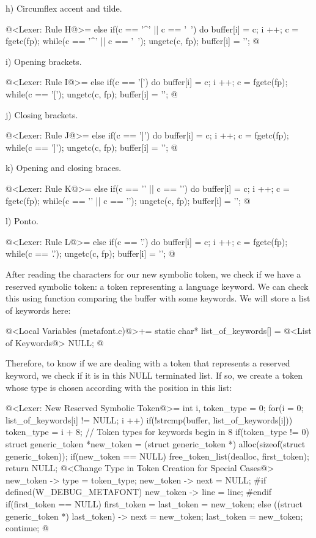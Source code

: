 h) Circumflex accent and tilde.

\iniciocodigo
@<Lexer: Rule H@>=
else if(c == '^' || c == '~'){
  do{
    buffer[i] = c;
    i ++;
    c = fgetc(fp);
  } while(c == '^' || c == '~');
  ungetc(c, fp);
  buffer[i] = '\0';
}
@
\fimcodigo

i) Opening brackets.

\iniciocodigo
@<Lexer: Rule I@>=
else if(c == '['){
  do{
    buffer[i] = c;
    i ++;
    c = fgetc(fp);
  } while(c == '[');
  ungetc(c, fp);
  buffer[i] = '\0';
}
@
\fimcodigo

j) Closing brackets.

\iniciocodigo
@<Lexer: Rule J@>=
else if(c == ']'){
  do{
    buffer[i] = c;
    i ++;
    c = fgetc(fp);
  } while(c == ']');
  ungetc(c, fp);
  buffer[i] = '\0';
}
@
\fimcodigo

k) Opening and closing braces.

\iniciocodigo
@<Lexer: Rule K@>=
else if(c == '{' || c == '}'){
  do{
    buffer[i] = c;
    i ++;
    c = fgetc(fp);
  } while(c == '{' || c == '}');
  ungetc(c, fp);
  buffer[i] = '\0';
}
@
\fimcodigo

l) Ponto.

\iniciocodigo
@<Lexer: Rule L@>=
else if(c == '.'){
  do{
    buffer[i] = c;
    i ++;
    c = fgetc(fp);
  } while(c == '.');
  ungetc(c, fp);
  buffer[i] = '\0';
}
@
\fimcodigo


After reading the characters for our new symbolic token, we check if
we have a reserved symbolic token: a token representing a language
keyword. We can check this using function 
comparing the buffer with some keywords. We will store a list of
keywords here:

\iniciocodigo
@<Local Variables (metafont.c)@>+=
static char* list_of_keywords[] = {
@<List of Keywords@>
  NULL};
@
\fimcodigo

Therefore, to know if we are dealing with a token that represents a
reserved keyword, we check if it is in this NULL terminated list. If
so, we create a token whose type is chosen according with the position
in this list:

\iniciocodigo
@<Lexer: New Reserved Symbolic Token@>=
{
  int i, token_type = 0;
  for(i = 0; list_of_keywords[i] != NULL; i ++)
    if(!strcmp(buffer, list_of_keywords[i]))
      token_type = i + 8; // Token types for keywords begin in 8
  if(token_type != 0){
    struct generic_token *new_token =
       (struct generic_token *) alloc(sizeof(struct generic_token));
    if(new_token == NULL){
      free_token_list(dealloc, first_token);
      return NULL;
    }
    @<Change Type in Token Creation for Special Cases@>
    new_token -> type = token_type;
    new_token -> next = NULL;
#if defined(W_DEBUG_METAFONT)
    new_token -> line = line;
#endif
    if(first_token == NULL)
      first_token = last_token = new_token;
    else{
      ((struct generic_token *) last_token) -> next = new_token;
      last_token = new_token;
    }
    continue;
  }
}
@
\fimcodigo

